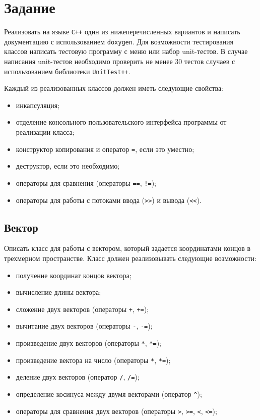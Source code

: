 \documentclass[a4paper,12pt]{article}
\begin{document}
\section{Задание}
\label{sec:Task}

Реализовать на языке \verb|С++| один из нижеперечисленных вариантов и
написать документацию с использованием \verb|doxygen|. Для возможности
тестирования классов написать тестовую программу с меню или набор
unit-тестов. В случае написания unit-тестов необходимо проверить не
менее 30 тестов случаев с использованием библиотеки \verb|UnitTest++|.

Каждый из реализованных классов должен иметь следующие свойства:

\begin{itemize}
\item инкапсуляция;
\item отделение консольного пользовательского интерфейса программы от
  реализации класса;
\item конструктор копирования и оператор \lstinline|=|, если это
  уместно;
\item деструктор, если это необходимо;
\item операторы для сравнения (операторы \lstinline|==|,
  \lstinline|!=|);
\item операторы для работы с потоками ввода (\lstinline|>>|) и вывода
  (\lstinline|<<|).
\end{itemize}

\subsection{Вектор}

Описать класс для работы с вектором, который задается координатами
концов в трехмерном пространстве.  Класс должен реализовывать
следующие возможности:

\begin{itemize}
\item получение координат концов вектора;
\item вычисление длины вектора;
\item сложение двух векторов (операторы \lstinline|+|,
  \lstinline|+=|);
\item вычитание двух векторов (операторы \lstinline|-|,
  \lstinline|-=|);
\item произведение двух векторов (операторы \lstinline|*|,
  \lstinline|*=|);
\item произведение вектора на число (операторы \lstinline|*|,
  \lstinline|*=|);
\item деление двух векторов (оператор \lstinline|/|, \lstinline|/=|);
\item определение косинуса между двумя векторами (оператор
  \lstinline|^|);
\item операторы для сравнения двух векторов (операторы \lstinline|>|,
  \lstinline|>=|, \lstinline|<|, \lstinline|<=|);
\end{itemize}
\end{document}
